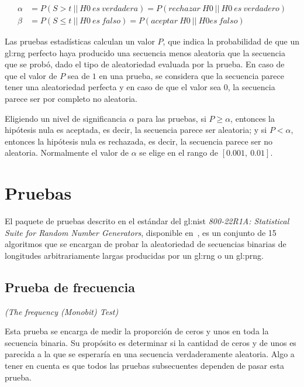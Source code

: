 \begin{align}
  \alpha &= P(S > t\: ||\: H0\: es\: verdadera)
          = P(rechazar\: H0\: ||\: H0\: es\: verdadero)\\
  \beta  &= P(S \leq t\: ||\: H0\: es\: falso)
          = P(aceptar\: H0\: ||\: H0 es\: falso)
\end{align}

Las pruebas estadísticas calculan un valor $P$, que indica la probabilidad de
que un \gls{gl:rng} perfecto haya producido una secuencia menos aleatoria que
la secuencia que se probó, dado el tipo de aleatoriedad evaluada por la prueba.
En caso de que el valor de $P$ sea de $1$ en una prueba, se considera que la
secuencia parece tener una aleatoriedad perfecta y en caso de que el valor
sea $0$, la secuencia parece ser por completo no aleatoria.

Eligiendo un nivel de significancia $\alpha$ para las pruebas, si $P \geq
\alpha$, entonces la hipótesis nula es aceptada, es decir, la secuencia
parece ser aleatoria; y si $P < \alpha$, entonces la hipótesis nula es
rechazada, es decir, la secuencia parece ser no aleatoria. Normalmente
el valor de $\alpha$ se elige en el rango de $[0.001,\: 0.01]$.

\section{Pruebas} %
\label{sec:lista_pruebas}

El paquete de pruebas descrito en el estándar del \gls{gl:nist}
\textit{800-22R1A: Statistical Suite for Random Number Generators}, disponible
en~\cite{nist_pruebas}, es un conjunto de 15 algoritmos que se encargan de
probar la aleatoriedad de secuencias binarias de longitudes arbitrariamente
largas producidas por un \gls{gl:rng} o un \gls{gl:prng}.

\subsection{Prueba de frecuencia} %
\textit{(The frequency (Monobit) Test)}

Esta prueba se encarga de medir la proporción de ceros y unos en toda la
secuencia binaria. Su propósito es determinar si la cantidad de ceros y de
unos es parecida a la que se esperaría en una secuencia verdaderamente
aleatoria. Algo a tener en cuenta es que todos las pruebas subsecuentes
dependen de pasar esta prueba.

